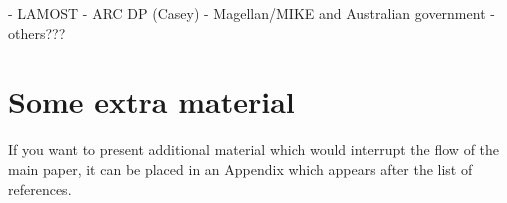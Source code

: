 \documentclass[a4paper,fleqn,usenatbib]{mnras}
\begin{document}
- LAMOST
- ARC DP (Casey)
- Magellan/MIKE and Australian government
- others???











\appendix

\section{Some extra material}

If you want to present additional material which would interrupt the flow of the main paper,
it can be placed in an Appendix which appears after the list of references.



\bsp	%
\label{lastpage}
\end{document}
